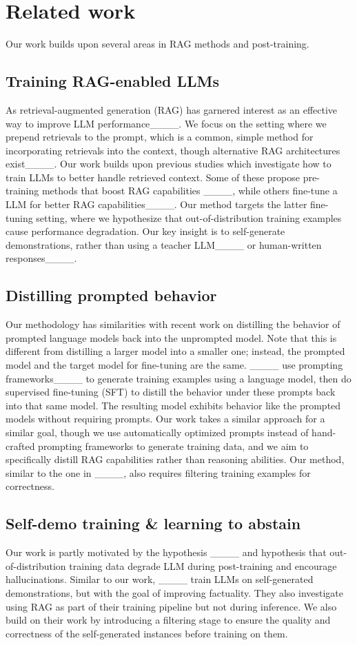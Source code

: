 \section{Related work}
Our work builds upon several areas in RAG methods and post-training.

\subsection{Training RAG-enabled LLMs}
As retrieval-augmented generation (RAG) has garnered interest as an effective way to improve LLM performance____.
We focus on the setting where we prepend retrievals to the prompt, which is a common, simple method for incorporating retrievals into the context, 
though alternative RAG architectures exist____. 
Our work builds upon previous studies which investigate how to train LLMs to better handle retrieved context.
Some of these propose pre-training methods that boost RAG capabilities
____,
while others fine-tune a LLM for better RAG capabilities____.
Our method targets the latter fine-tuning setting, where we hypothesize that out-of-distribution training examples cause performance degradation. 
Our key insight is to self-generate demonstrations, 
rather than using a teacher LLM____
or human-written responses____.

\subsection{Distilling prompted behavior}
Our methodology has similarities with recent work on distilling the behavior of prompted language models back into the unprompted model.
Note that this is different from distilling a larger model into a smaller one; instead, the prompted model and the target model for fine-tuning are the same.
____ use prompting frameworks____
to generate training examples using a language model, 
then do supervised fine-tuning (SFT) to distill the behavior under these prompts back into that same model.
The resulting model exhibits behavior like the prompted models without requiring prompts. 
Our work takes a similar approach for a similar goal,
though we use automatically optimized prompts instead of hand-crafted prompting frameworks to generate training data,
and we aim to specifically distill RAG capabilities rather than reasoning abilities.
Our method, similar to the one in ____,
also requires filtering training examples for correctness.

\subsection{Self-demo training \& learning to abstain}
Our work is partly motivated by the hypothesis ____ and  hypothesis that out-of-distribution training data degrade LLM during post-training and encourage hallucinations.
Similar to our work, ____ train LLMs on self-generated demonstrations, but with the goal of improving factuality.
They also investigate using RAG as part of their training pipeline but not during inference.
We also build on their work by introducing a filtering stage to ensure the quality and correctness of the self-generated instances before training on them. 

